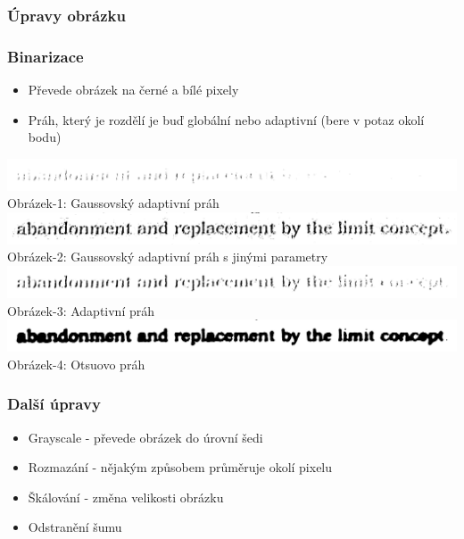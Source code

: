 \documentclass{beamer}
\begin{document}
\subsubsection{Úpravy obrázku}
\begin{frame}
\frametitle{Binarizace}
\begin{itemize}
\item Převede obrázek na černé a bílé pixely
\item Práh, který je rozdělí je buď globální nebo adaptivní (bere v potaz okolí bodu)
\end{itemize}
		\begin{center}
     	\includegraphics[width=1\textwidth]{obrazky/threshold_gauss(9,4).jpg}
     	Obrázek-1: Gaussovský adaptivní práh\\
     	\includegraphics[width=1\textwidth]{obrazky/threshold_gauss(15,2).jpg}
     	Obrázek-2: Gaussovský adaptivní práh s jinými parametry\\
		\includegraphics[width=1\textwidth]{obrazky/threshold_mean(9,4).jpg}
     	Obrázek-3: Adaptivní práh\\
     	\includegraphics[width=1\textwidth]{obrazky/threshold_otsu.jpg}
     	Obrázek-4: Otsuovo práh\\
     	\end{center}
\end{frame}
\begin{frame}
\frametitle{Další úpravy}
\begin{itemize}
\item Grayscale - převede obrázek do úrovní šedi
\item Rozmazání - nějakým způsobem průměruje okolí pixelu
\item Škálování - změna velikosti obrázku
\item Odstranění šumu
\end{itemize}
\end{frame}
\end{document}
